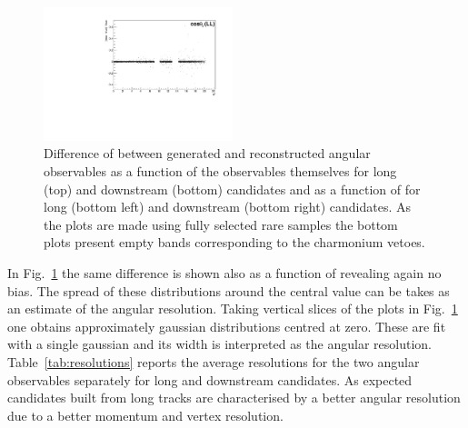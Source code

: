 \begin{figure}
\includegraphics[width=0.49\textwidth]{Lmumu/figs/resolution/RmTcosThetaL_vs_q2_LL.pdf}
 \caption{Difference of between generated and reconstructed angular observables as a function of 
 the observables themselves for long (top) and downstream (bottom) candidates and as a function 
 of \qsq for long (bottom left) and downstream (bottom right) candidates.
 As the plots are made using fully selected rare samples the bottom plots present empty bands
 corresponding to the charmonium vetoes.
 }
\label{fig:resolutionvsq2ang}
\end{figure}
%
In Fig.~\ref{fig:resolutionvsq2ang} the same difference is shown also as a function of \qsq revealing again no bias.
The spread of these distributions around the central value can be takes as an estimate of the angular resolution.
Taking vertical slices of the plots in Fig.~\ref{fig:resolutionvsq2ang} one obtains approximately gaussian
distributions centred at zero. These are fit with a single gaussian and its width
is interpreted as the angular resolution. Table~\ref{tab:resolutions} reports the average resolutions
for the two angular observables separately for long and downstream candidates. As expected candidates built
from long tracks are characterised by a better angular resolution due to a better momentum and vertex resolution.
%
%
